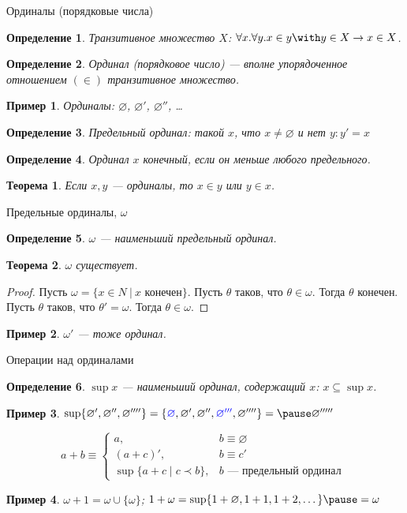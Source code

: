\documentclass[aspectratio=169]{beamer}
\newtheorem{thm}{Теорема}[section]
\newtheorem{dfn}{Определение}[section]
\newtheorem{exm}{Пример}[section]
\begin{document}
\begin{frame}{Ординалы (порядковые числа)}
\begin{dfn}Транзитивное множество $X$: $\forall x.\forall y.x \in y \with y \in X \rightarrow x \in X$.\end{dfn}\pause
\begin{dfn}Ординал (порядковое число) --- вполне упорядоченное отношением $(\in)$ транзитивное множество.\end{dfn}\pause
\begin{exm}Ординалы: $\varnothing$, \pause $\varnothing'$, \pause $\varnothing''$, \dots\end{exm}\pause
\begin{dfn}Предельный ординал: такой $x$, что $x \ne \varnothing$ и нет $y: y' = x$\end{dfn}\pause
\begin{dfn}Ординал $x$ конечный, если он меньше любого предельного.\end{dfn}\pause
\begin{thm}Если $x,y$ --- ординалы, то $x\in y$ или $y \in x$.\end{thm}
\end{frame}
\begin{frame}{Предельные ординалы, $\omega$}
\begin{dfn}$\omega$ --- наименьший предельный ординал.\end{dfn}\pause
\begin{thm}$\omega$ существует.\end{thm}\pause
\begin{proof}Пусть $\omega = \{ x \in N\ |\ x\text{ конечен}\}$. 
Пусть $\theta$ таков, что $\theta \in \omega$. Тогда $\theta$ конечен. \pause
Пусть $\theta$ таков, что $\theta' = \omega$. Тогда $\theta \in \omega$.\end{proof}
\begin{exm}$\omega'$ --- тоже ординал.\end{exm}
\end{frame}

\begin{frame}{Операции над ординалами}
\begin{dfn}$\sup x$ --- наименьший ординал, содержащий $x$: $x \subseteq \sup x$.\end{dfn} \pause
\begin{exm}$\sup \{ \varnothing', \varnothing'', \varnothing'''' \} = \{ {\color{blue}\varnothing},
   \varnothing', \varnothing'', {\color{blue} \varnothing '''}, \varnothing'''' \} = \pause \varnothing'''''$\end{exm} \pause
$$a + b \equiv \left\{ \begin{array}{rl} 
   a, & b \equiv \varnothing\\
   (a + c)', & b \equiv c'\\
   \sup \{ a+c \mid c \prec b \}, &\mbox{$b$ --- предельный ординал }\end{array}\right.$$\pause

\begin{exm}$\omega + 1 = \omega \cup \{\omega\}$; \pause $1 + \omega = \sup\{ 1+\varnothing, 1+1, 1+2, \dots \} \pause = \omega$\end{exm}
\end{frame}
\end{document}
